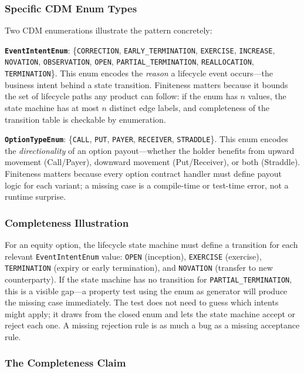\documentclass[11pt,a4paper]{article}
\begin{document}
\subsubsection{Specific CDM Enum Types}

Two CDM enumerations illustrate the pattern concretely:

\noindent\textbf{\texttt{EventIntentEnum}}: \{\texttt{CORRECTION}, \texttt{EARLY\_TERMINATION}, \texttt{EXERCISE}, \texttt{INCREASE}, \texttt{NOVATION}, \texttt{OBSERVATION}, \texttt{OPEN}, \texttt{PARTIAL\_TERMINATION}, \texttt{REALLOCATION}, \texttt{TERMINATION}\}. This enum encodes the \emph{reason} a lifecycle event occurs---the business intent behind a state transition. Finiteness matters because it bounds the set of lifecycle paths any product can follow: if the enum has $n$ values, the state machine has at most $n$ distinct edge labels, and completeness of the transition table is checkable by enumeration.

\noindent\textbf{\texttt{OptionTypeEnum}}: \{\texttt{CALL}, \texttt{PUT}, \texttt{PAYER}, \texttt{RECEIVER}, \texttt{STRADDLE}\}. This enum encodes the \emph{directionality} of an option payout---whether the holder benefits from upward movement (Call/Payer), downward movement (Put/Receiver), or both (Straddle). Finiteness matters because every option contract handler must define payout logic for each variant; a missing case is a compile-time or test-time error, not a runtime surprise.

\subsubsection{Completeness Illustration}

For an equity option, the lifecycle state machine must define a transition for each relevant \texttt{EventIntentEnum} value: \texttt{OPEN} (inception), \texttt{EXERCISE} (exercise), \texttt{TERMINATION} (expiry or early termination), and \texttt{NOVATION} (transfer to new counterparty). If the state machine has no transition for \texttt{PARTIAL\_TERMINATION}, this is a visible gap---a property test using the enum as generator will produce the missing case immediately. The test does not need to guess which intents might apply; it draws from the closed enum and lets the state machine accept or reject each one. A missing rejection rule is as much a bug as a missing acceptance rule.

\subsubsection{The Completeness Claim}
\end{document}
